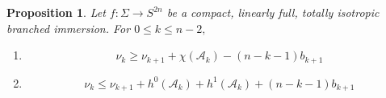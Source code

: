 \documentclass[11pt]{article}
\newtheorem{prop}[theorem]{Proposition}
\theoremstyle{definition}
\numberwithin{equation}{section}
\begin{document}
\begin{prop}\label{prop:nullityinduction}
    Let $f: \Sigma \to S^{2n}$ be a compact, linearly full, totally isotropic branched immersion. For $0 \leq k \leq n-2,$
    \begin{enumerate}[label=(\alph*)]
        \item \begin{equation}
            \nu_k \geq \nu_{k+1} + \chi(\mathcal{A}_k) - (n-k-1)b_{k+1}
        \end{equation}
        \item
            \begin{equation}
                \nu_k \leq \nu_{k+1} + h^0(\mathcal{A}_k) + h^1(\mathcal{A}_k) + (n-k-1)b_{k+1}
            \end{equation}
    \end{enumerate}
\end{prop}
\end{document}
